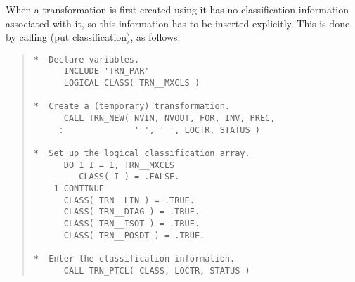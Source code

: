 When a transformation is first created using  it has no
classification information associated with it, so this information has to be
inserted explicitly. 
This is done by calling  (put classification), as follows: 


\begin{quote}
\begin{tabbing} 

\verb#*  Declare variables.                                  #\\
\verb#      INCLUDE 'TRN_PAR'                                #\\
\verb#      LOGICAL CLASS( TRN__MXCLS )                      #\\
\verb#                                                       #\\
\verb#*  Create a (temporary) transformation.                #\\
\verb#      CALL TRN_NEW( NVIN, NVOUT, FOR, INV, PREC,       #\\
\verb#     :              ' ', ' ', LOCTR, STATUS )          #\\
\verb#                                                       #\\
\verb#*  Set up the logical classification array.            #\\
\verb#      DO 1 I = 1, TRN__MXCLS                           #\\
\verb#         CLASS( I ) = .FALSE.                          #\\
\verb#    1 CONTINUE                                         #\\
\verb#      CLASS( TRN__LIN ) = .TRUE.                       #\\
\verb#      CLASS( TRN__DIAG ) = .TRUE.                      #\\
\verb#      CLASS( TRN__ISOT ) = .TRUE.                      #\\
\verb#      CLASS( TRN__POSDT ) = .TRUE.                     #\\
\verb#                                                       #\\
\verb#*  Enter the classification information.               #\\
\verb#      CALL TRN_PTCL( CLASS, LOCTR, STATUS )            #

\end{tabbing}
\end{quote} 


